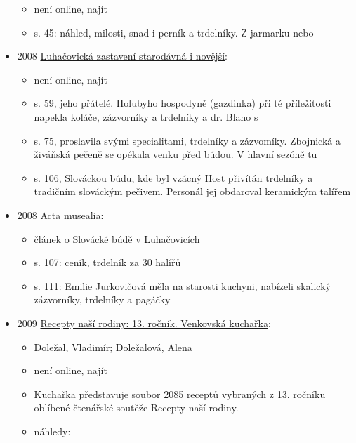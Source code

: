 \begin{itemize}
  \begin{itemize}
  \tightlist
  \item
    není online, najít
  \item
    s. 45: náhled, milosti, snad i perník a trdelníky. Z jarmarku nebo
  \end{itemize}
\item
  2008
  \href{https://ceskadigitalniknihovna.cz/uuid/uuid:b2d480f0-9aeb-11e3-8e84-005056827e51}{Luhačovická
  zastavení starodávná i novější}:

  \begin{itemize}
  \tightlist
  \item
    není online, najít
  \item
    s. 59, jeho přátelé. Holubyho hospodyně (gazdinka) při té
    příležitosti napekla koláče, zázvorníky a trdelníky a dr. Blaho s
  \item
    s. 75, proslavila svými specialitami, trdelníky a zázvomíky.
    Zbojnická a živáňská pečeně se opékala venku před búdou. V hlavní
    sezóně tu
  \item
    s. 106, Slováckou búdu, kde byl vzácný Host přivítán trdelníky a
    tradičním slováckým pečivem. Personál jej obdaroval keramickým
    talířem
  \end{itemize}
\item
  2008
  \href{https://ceskadigitalniknihovna.cz/uuid/uuid:06cd95f1-915c-4408-8ab5-5e8abdacd4ea}{Acta
  musealia}:

  \begin{itemize}
  \tightlist
  \item
    článek o Slovácké búdě v Luhačovicích
  \item
    s. 107: ceník, trdelník za 30 halířů
  \item
    s. 111: Emilie Jurkovičová měla na starosti kuchyni, nabízeli
    skalický zázvorníky, trdelníky a pagáčky
  \end{itemize}
\item
  2009
  \href{https://ceskadigitalniknihovna.cz/uuid/uuid:33331cf0-d935-11e5-a3e0-005056827e51}{Recepty
  naší rodiny: 13. ročník. Venkovská kuchařka}:

  \begin{itemize}
  \tightlist
  \item
    Doležal, Vladimír; Doležalová, Alena
  \item
    není online, najít
  \item
    Kuchařka představuje soubor 2085 receptů vybraných z 13. ročníku
    oblíbené čtenářské soutěže Recepty naší rodiny.
  \item
    náhledy:


\end{itemize}
\end{itemize}

